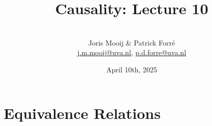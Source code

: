 \title[Causality]{Causality: Lecture 10}
\author[Joris Mooij]{\\[5mm]\large Joris Mooij \& Patrick Forr\'e\\
\url{j.m.mooij@uva.nl}, \url{p.d.forre@uva.nl}}
\date[2025-04-10]{\normalsize April 10th, 2025}
\maketitle


\part{Equivalence Relations}
\frame{\partpage}

